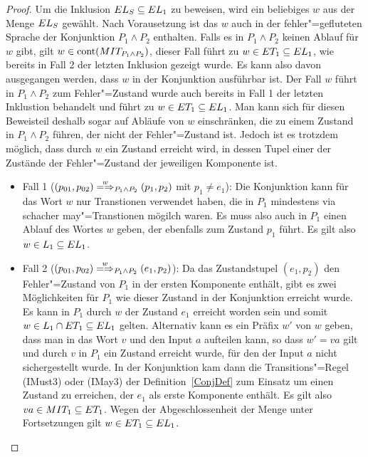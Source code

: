 \begin{proof}
  Um die Inklusion $EL _S\subseteq EL _1$ zu beweisen, wird ein beliebiges $w$
  aus der Menge $EL _S$ gewählt. Nach Vorausetzung ist das $w$ auch in der
  fehler"=gefluteten Sprache der Konjunktion $P_1\land P_2$ enthalten. Falls
  es in $P_1\land P_2$ keinen Ablauf für $w$ gibt, gilt $w\in\mathrm{cont} (MIT
  _{P_1\land P_2})$, dieser Fall führt zu $w\in ET _1\subseteq EL _1$, wie
  bereits in Fall 2 der letzten Inklusion gezeigt wurde. Es kann also davon
  ausgegangen werden, dass $w$ in der Konjunktion ausführbar ist. Der Fall $w$
  führt in $P_1\land P_2$ zum Fehler"=Zustand wurde auch bereits in Fall 1 der
  letzten Inklustion behandelt und führt zu $w\in ET _1\subseteq EL _1$. Man
  kann sich für diesen Beweisteil deshalb sogar auf Abläufe von $w$
  einschränken, die zu einem Zustand in $P_1\land P_2$ führen, der nicht der
  Fehler"=Zustand ist. Jedoch ist es trotzdem möglich, dass durch $w$ ein
  Zustand erreicht wird, in dessen Tupel einer der Zustände der Fehler"=Zustand
  der jeweiligen Komponente ist.
  \begin{itemize}
    \item Fall 1 ($(p_{01},p_{02})\weakmay[w]_{P_1\land P_2} (p_1,p_2)$ mit
      $p_1\neq e_1$): Die Konjunktion kann für das Wort $w$ nur Transtionen
      verwendet haben, die in $P_1$ mindestens via schacher may"=Transtionen
      mögilch waren. Es muss also auch in $P_1$ einen Ablauf des Wortes $w$
      geben, der ebenfalls zum Zustand $p_1$ führt. Es gilt also $w\in L_1
      \subseteq EL _1$.
    \item Fall 2 ($(p_{01},p_{02})\weakmay[w]_{P_1\land P_2} (e_1,p_2)$): Da
      das Zustandstupel $(e_1,p_2)$ den Fehler"=Zustand von $P_1$ in der ersten
      Komponente enthält, gibt es zwei Möglichkeiten für $P_1$ wie dieser
      Zustand in der Konjunktion erreicht wurde. Es kann in $P_1$ durch $w$ der
      Zustand $e_1$ erreicht worden sein und somit $w\in L_1\cap ET
      _1\subseteq EL _1$ gelten. Alternativ kann es ein Präfix $w'$ von $w$
      geben, dass man in das Wort $v$ und den Input $a$ aufteilen kann, so dass
      $w'=va$ gilt und durch $v$ in $P_1$ ein Zustand erreicht wurde, für den
      der Input $a$ nicht sichergestellt wurde. In der Konjunktion kam dann die
      Transitions"=Regel (IMust3) oder (IMay3) der Definition~\ref{ConjDef} zum
      Einsatz um einen Zustand zu erreichen, der $e_1$ als erste Komponente
      enthält. Es gilt also $va\in MIT _1\subseteq ET _1$. Wegen der
      Abgeschlossenheit der Menge \ET{} unter Fortsetzungen gilt $w\in ET _1
      \subseteq EL _1$.
  \end{itemize}
\end{proof}
